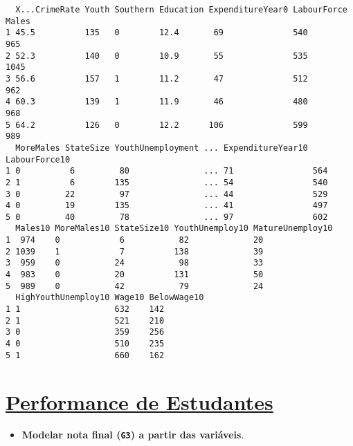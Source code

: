 \documentclass[12pt]{abntex2}
\begin{document}
\begin{verbatim}
  X...CrimeRate Youth Southern Education ExpenditureYear0 LabourForce Males
1 45.5          135   0        12.4       69              540          965 
2 52.3          140   0        10.9       55              535         1045 
3 56.6          157   1        11.2       47              512          962 
4 60.3          139   1        11.9       46              480          968 
5 64.2          126   0        12.2      106              599          989 
  MoreMales StateSize YouthUnemployment ... ExpenditureYear10 LabourForce10
1 0          6         80               ... 71                564          
2 1          6        135               ... 54                540          
3 0         22         97               ... 44                529          
4 0         19        135               ... 41                497          
5 0         40         78               ... 97                602          
  Males10 MoreMales10 StateSize10 YouthUnemploy10 MatureUnemploy10
1  974    0            6           82             20              
2 1039    1            7          138             39              
3  959    0           24           98             33              
4  983    0           20          131             50              
5  989    0           42           79             24              
  HighYouthUnemploy10 Wage10 BelowWage10
1 1                   632    142        
2 1                   521    210        
3 0                   359    256        
4 0                   510    235        
5 1                   660    162        
\end{verbatim}

\section{\href{https://archive.ics.uci.edu/ml/datasets/Student+Performance\#}{Performance de Estudantes}}
\label{sec:org75078c3}
\begin{itemize}
\item \textbf{Modelar nota final (\texttt{G3}) a partir das variáveis}.
\end{itemize}
\end{document}
